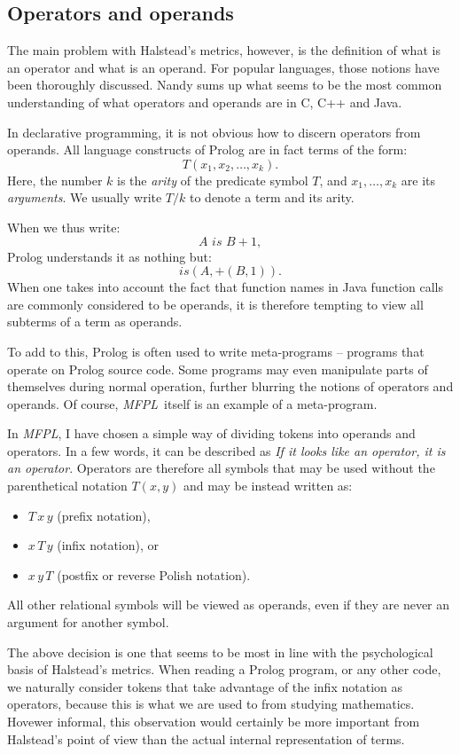 \documentclass[11pt,a4paper,twoside]{article}
\newcommand{\pname}{\emph{MFPL}}
\begin{document}
\begin{multicols}{2}
\subsection{Operators and operands}
The main problem with Halstead's metrics, however, is the definition
of what is an operator and what is an operand. For popular languages,
those notions have been thoroughly discussed. Nandy\cite{nandy} sums
up what seems to be the most common understanding of what operators
and operands are in C, C++ and Java. 

In declarative programming, it is not obvious how to discern operators
from operands. All language constructs of Prolog are in fact terms of
the form:
$$T(x_1, x_2, \dots, x_k).$$ 
Here, the number $k$ is the \emph{arity}
of the predicate symbol $T$, and $x_1, \dots, x_k$ are its
\emph{arguments}. We usually write $T/k$ to denote a term and its arity. 

When we thus write:
$$A\,\, is\,\, B + 1,$$ 
Prolog understands it as nothing but:
$$is(A, +(B, 1)).$$ When one takes into account the fact that function
names in Java function calls are commonly considered to be operands,
it is therefore tempting to view all subterms of a term as operands.

To add to this, Prolog is often used to write meta-programs --
programs that operate on Prolog source code. Some programs may even
manipulate parts of themselves during normal operation, further
blurring the notions of operators and operands. Of course,
\pname\ itself is an example of a meta-program.

In \pname, I have chosen a simple way of dividing tokens into operands
and operators. In a few words, it can be described as \emph{If it looks
  like an operator, it is an operator}. Operators are therefore all
symbols that may be used without the parenthetical notation $T(x, y)$
and may be instead written as: 
\begin{itemize}
\item $T\, x\, y$ (prefix notation),
\item $x\,T\, y$ (infix notation), or 
\item $x\, y\, T$ (postfix or reverse Polish notation).
\end{itemize}
All other relational symbols will be viewed as operands, even if they
are never an argument for another symbol.

The above decision is one that seems to be most in line with the
psychological basis of Halstead's metrics. When reading a Prolog
program, or any other code, we naturally consider tokens that take
advantage of the infix notation as operators, because this is what we
are used to from studying mathematics. Hovewer informal, this
observation would certainly be more important from Halstead's point of
view than the actual internal representation of terms.


\end{multicols}
\end{document}
